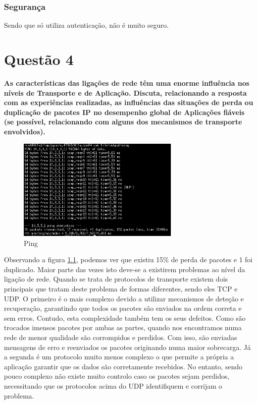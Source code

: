 \documentclass[a4paper]{report}
\begin{document}
\subsection{Segurança}
Sendo que só utiliza autenticação, não é muito seguro.

\chapter{Questão 4}
\textbf{As características das ligações de rede têm uma enorme influência nos
níveis de Transporte e de Aplicação. Discuta, relacionando a resposta com as
experiências realizadas, as influências das situações de perda ou duplicação de
pacotes IP no desempenho global de Aplicações fiáveis (se possível, relacionando
com alguns dos mecanismos de transporte envolvidos).}

\begin{figure}[H]
    \centering 
    \includegraphics[width=0.7\textwidth]{images/4.png}  
    \caption{Ping}
    \label{fig:4}
\end{figure}
Observando a figura \ref{fig:4}, podemos ver que existiu 15\% de perda de pacotes e 1 foi duplicado. Maior parte das vezes isto
deve-se a existirem problemas ao nível da ligação de rede. Quando se trata de protocolos de transporte existem dois principais
que tratam deste problema de formas diferentes, sendo eles TCP e UDP. O primeiro é o mais complexo devido a utilizar mecanismos
de deteção e recuperação, garantindo que todos os pacotes são enviados na ordem correta e sem erros. Contudo, esta complexidade
também tem os seus defeitos. Como são trocados imensos pacotes por ambas as partes, quando nos encontramos numa rede de menor 
qualidade são corrompidos e perdidos. Com isso, são enviadas mensagens de erro e reenviados os pacotes originando numa maior
sobrecarga. Já a segunda é um protocolo muito menos complexo o que permite a própria a aplicação garantir que os dados são 
corretamente recebidos. No entanto, sendo pouco complexo não existe muito controlo caso os pacotes sejam perdidos, necessitando
que os protocolos acima do UDP identifiquem e corrijam o problema.
\end{document}

